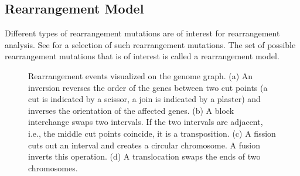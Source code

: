\documentclass{svmult}
\newcommand{\m}[1]{\mathcal{#1}}
\begin{document}
\subsection{Rearrangement Model}


Different types of rearrangement mutations are of interest for rearrangement analysis. See  for a selection of such rearrangement mutations. The set of possible rearrangement mutations that is of interest is called a rearrangement model. 

\begin{figure}
	\begin{center}
	\quad
	\quad
	\end{center}
	\caption{Rearrangement events visualized on the genome graph. (a) An inversion reverses the order of the 
	genes between two cut points (a cut is indicated by a scissor, a join is
	indicated by a plaster) and inverses the orientation of the affected genes. (b) A block interchange swaps two intervals. If the two intervals are 
	adjacent, i.e., the middle cut points coincide, it is a transposition. (c) A fission cuts out an interval and 
	creates a circular chromosome. 
	A fusion inverts this operation. (d) A translocation swaps the ends of two chromosomes. }
	\label{fig:events}
\end{figure}
\end{document}
